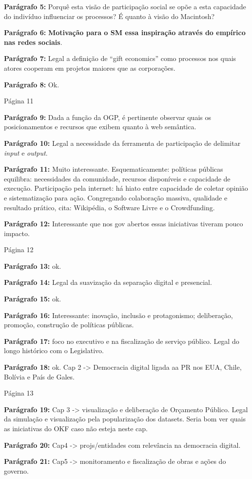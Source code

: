\documentclass[12pt]{report}
\newcommand{\pp}[1]{

\textbf{Parágrafo #1:}
}
\begin{document}
\pp{5} Porquê esta visão de participação social se opõe a esta capacidade do indivíduo influenciar os processos? É quanto à visão do Macintosh?

\pp{6} {\bf \color{red} Motivação para o SM essa inspiração através do empírico nas redes sociais}.

\pp{7} Legal a definição de ``gift economics'' como processos nos quais atores cooperam em projetos maiores que as corporações.

\pp{8} Ok.

\noindent Página 11

\pp{9} Dada a função da OGP, é pertinente observar quais os posicionamentos e recursos que exibem quanto à web semântica.

\pp{10} Legal a necessidade da ferramenta de participação de delimitar \emph{input} e \emph{output}.

\pp{11} Muito interessante. Esquematicamente: políticas públicas equilibra: necessidades da comunidade, recursos disponíveis e capacidade de execução. Participação pela internet: há hiato entre capacidade de coletar opinião e sistematização para ação. Congregando colaboração massiva, qualidade e resultado prático, cita: Wikipédia, o Software Livre e o Crowdfunding.

\pp{12} Interessante que nos gov abertos essas iniciativas tiveram pouco impacto.

\noindent Página 12

\pp{13} ok.

\pp{14} Legal da suavização da separação digital e presencial.

\pp{15} ok.

\pp{16} Interessante: inovação, inclusão e protagonismo; deliberação, promoção, construção de políticas públicas.

\pp{17} foco no executivo e na fiscalização de serviço público. Legal do longo histórico com o Legislativo.

\pp{18} ok. Cap 2 -> Democracia digital ligada aa PR nos EUA, Chile, Bolívia e País de Gales.

\noindent Página 13

\pp{19} Cap 3 -> visualização e deliberação de Orçamento Público.
Legal da simulação e visualização pela popularização dos datasets. Seria bom ver quais as iniciativas do OKF caso não esteja neste cap.

\pp{20} Cap4 -> projs/entidades com relevância na democracia digital.

\pp{21} Cap5 -> monitoramento e fiscalização de obras e ações do governo.
\end{document}
